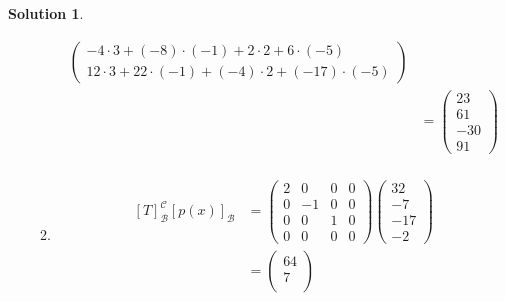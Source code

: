\documentclass[10pt]{article}
\theoremstyle{definition}
\newtheorem{soln}{Solution}
\begin{document}
\begin{soln}
\begin{enumerate}[label=(\alph*)]
\begin{enumerate}[label=(\roman*)]
\begin{align*}
\begin{pmatrix}
                          -4\cdot 3+(-8)\cdot (-1)+2\cdot 2+6\cdot(-5)     \\
                          12\cdot 3+22\cdot (-1)+(-4)\cdot 2+(-17)\cdot (-5)
                        \end{pmatrix} \\
                     & =\begin{pmatrix}
                          23  \\
                          61  \\
                          -30 \\
                          91
                        \end{pmatrix}                                    \\
                  \end{align*}
            \item \begin{align*}
                    \left[T\right]_\mathcal{B}^\mathcal{C}
                    \left[p(x)\right]_\mathcal{B} & =\begin{pmatrix}
                                                       2 & 0  & 0 & 0 \\
                                                       0 & -1 & 0 & 0 \\
                                                       0 & 0  & 1 & 0 \\
                                                       0 & 0  & 0 & 0
                                                     \end{pmatrix}\begin{pmatrix}
                                                                    32  \\
                                                                    -7  \\
                                                                    -17 \\
                                                                    -2
                                                                  \end{pmatrix} \\
                                                  & = \begin{pmatrix}
                                                        64  \\
                                                        7   \\

\end{pmatrix}
\end{align*}
\end{enumerate}
\end{enumerate}
\end{soln}
\end{document}
